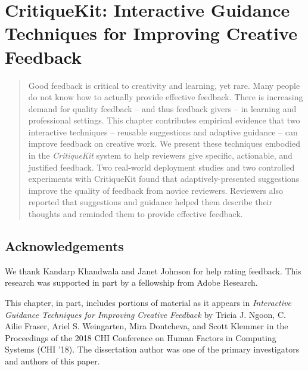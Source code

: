 \chapter{CritiqueKit: Interactive Guidance Techniques for Improving Creative Feedback}
\label{chapter:critiquekit}
\begin{quote}
Good feedback is critical to creativity and learning, yet rare. Many people do not know how to actually provide effective feedback. There is increasing demand for quality feedback – and thus feedback givers – in learning and professional settings. This chapter contributes empirical evidence that two interactive techniques – reusable suggestions and adaptive guidance – can improve feedback on creative work. We present these techniques embodied in the \textit{CritiqueKit} system to help reviewers give specific, actionable, and justified feedback. Two real-world deployment studies and two controlled experiments with CritiqueKit found that adaptively-presented suggestions improve the quality of feedback from novice reviewers. Reviewers also reported that suggestions and guidance helped them describe their thoughts and reminded them to provide effective feedback.
\end{quote}









\section{Acknowledgements}
We thank Kandarp Khandwala and Janet Johnson for help rating feedback. This research was supported in part by a fellowship from Adobe Research.

This chapter, in part, includes portions of material as it appears in \textit{Interactive Guidance Techniques for Improving Creative Feedback} by Tricia J. Ngoon, C. Ailie Fraser, Ariel S. Weingarten, Mira Dontcheva, and Scott Klemmer in the Proceedings of the 2018 CHI Conference on Human Factors in Computing Systems (CHI '18). The dissertation author was one of the primary investigators and authors of this paper.
